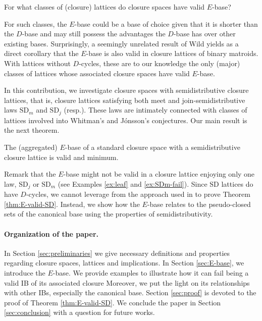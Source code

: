 \documentclass[12pt, a4paper]{article}
\newcommand{\SDj}{\mathrm{SD}_j}  %
\newcommand{\SDm}{\mathrm{SD}_m}  %
\newcommand{\SD}{\mathrm{SD}}  %
\begin{document}
\begin{rstquestion}[restate=QUESE-valid, label=ques:E-valid]
For what classes of (closure) lattices do closure spaces have valid $E$-base?
\end{rstquestion}

For such classes, the $E$-base could be a base of choice given that it is shorter than the $D$-base and may still possess the advantages the $D$-base has over other existing bases. 
Surprisingly, a seemingly unrelated result of Wild \cite[Theorem 11]{wild1994theory} yields as a direct corollary that the $E$-base is also valid in closure lattices of binary matroids. 
With lattices without $D$-cycles, these are to our knowledge the only (major) classes of lattices whose associated closure spaces have valid $E$-base.

In this contribution, we investigate closure spaces with semidistributive closure lattices, that is, closure lattices satisfying both meet and join-semidistributive laws $\SDm$ and $\SDj$ (resp.).
These laws are intimately connected with classes of lattices involved into Whitman's and J\'onsson's conjectures.
Our main result is the next theorem.


\begin{rsttheorem}[restate=THMEvalidSD, label=thm:E-valid-SD]
The (aggregated) $E$-base of a standard closure space with a semidistributive closure lattice is valid and minimum.
\end{rsttheorem}

Remark that the $E$-base might not be valid in a closure lattice enjoying only one law, $\SDj$ or $\SDm$ (see Examples \ref{ex:leaf} and \ref{ex:SDm-fail}). 
Since $\SD$ lattices do have $D$-cycles, we cannot leverage from the approach used in \cite{freese1995free,adaricheva2013ordered} to prove Theorem \ref{thm:E-valid-SD}.
Instead, we show how the $E$-base relates to the pseudo-closed sets of the canonical base \cite{guigues1986familles} using the properties of semidistributivity.


\paragraph{Organization of the paper.} In Section \ref{sec:preliminaries} we give necessary definitions and properties regarding closure spaces, lattices and implications.
In Section \ref{sec:E-base}, we introduce the $E$-base.
We provide examples to illustrate how it can fail being a valid IB of its associated closure Moreover, we put the light on its relationships with other IBs, especially the canonical base.
Section \ref{sec:proof} is devoted to the proof of Theorem \ref{thm:E-valid-SD}.
We conclude the paper in Section \ref{sec:conclusion} with a question for future works.
\end{document}
